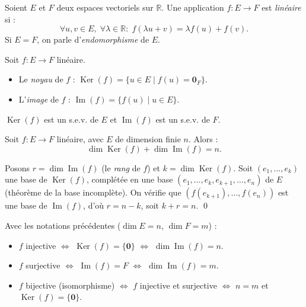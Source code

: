 \documentclass[11pt,a4paper,twoside]{book}
\newcommand{\R}{\mathbb{R}}
\DeclareMathOperator{\Im}{Im}
\DeclareMathOperator{\Ker}{Ker}
\begin{document}
\begin{definitionbox}
Soient $E$ et $F$ deux espaces vectoriels sur $\R$.
Une application $f : E \to F$ est \emph{linéaire} si :
\[
  \forall u,v \in E,\;\forall \lambda \in \R :\;
  f(\lambda u + v) = \lambda f(u) + f(v).
\]
Si $E = F$, on parle d'\emph{endomorphisme} de $E$.
\end{definitionbox}

\begin{definitionbox}
Soit $f : E \to F$ linéaire.
\begin{itemize}
  \item Le \emph{noyau} de $f$ : $\Ker(f) = \{u \in E \mid f(u) = \mathbf{0}_F\}$.
  \item L'\emph{image} de $f$ : $\Im(f) = \{f(u) \mid u \in E\}$.
\end{itemize}
$\Ker(f)$ est un s.e.v. de $E$ et $\Im(f)$ est un s.e.v. de $F$.
\end{definitionbox}

\begin{theoremebox}
Soit $f : E \to F$ linéaire, avec $E$ de dimension finie $n$. Alors :
\[
  \dim \Ker(f) + \dim \Im(f) = n.
\]
\end{theoremebox}

\begin{preuvebox}
Posons $r = \dim \Im(f)$ (le \emph{rang} de $f$) et $k = \dim \Ker(f)$.
Soit $(e_1,\ldots,e_k)$ une base de $\Ker(f)$, complétée en une base
$(e_1,\ldots,e_k,e_{k+1},\ldots,e_n)$ de $E$ (théorème de la base incomplète).
On vérifie que $(f(e_{k+1}),\ldots,f(e_n))$ est une base de $\Im(f)$,
d'où $r = n-k$, soit $k+r = n$. \qed
\end{preuvebox}

\begin{theoremebox}
Avec les notations précédentes ($\dim E = n$, $\dim F = m$) :
\begin{itemize}
  \item $f$ injective $\iff$ $\Ker(f) = \{\mathbf{0}\}$ $\iff$ $\dim \Im(f) = n$.
  \item $f$ surjective $\iff$ $\Im(f) = F$ $\iff$ $\dim \Im(f) = m$.
  \item $f$ bijective (isomorphisme) $\iff$ $f$ injective et surjective $\iff$ $n = m$ et $\Ker(f) = \{\mathbf{0}\}$.
\end{itemize}
\end{theoremebox}
\end{document}
